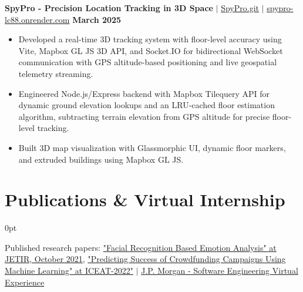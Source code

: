 \documentclass[letterpaper,10pt]{article}
\newlength{\contentindent}
\newcommand{\sectioncontent}[1]{%
  \begin{adjustwidth}{\contentindent}{0pt}%
  #1%
  \end{adjustwidth}%
}
\begin{document}
{\textbf{SpyPro - Precision Location Tracking in 3D Space} $|$ \href{https://github.com/Saurav-Kalaskar/SpyPro.git}{SpyPro.git} $|$ \href{https://spypro-lc88.onrender.com/} {spypro-lc88.onrender.com} \hfill \textbf{March 2025}
\begin{itemize}
    \item Developed a real-time 3D tracking system with floor-level accuracy using Vite, Mapbox GL JS 3D API, and Socket.IO for bidirectional WebSocket communication with GPS altitude-based positioning and live geospatial telemetry streaming.
    \item Engineered Node.js/Express backend with Mapbox Tilequery API for dynamic ground elevation lookups and an LRU-cached floor estimation algorithm, subtracting terrain elevation from GPS altitude for precise floor-level tracking.
    \item Built 3D map visualization with Glassmorphic UI, dynamic floor markers, and extruded buildings using Mapbox GL JS.
\end{itemize}
}


\section{Publications \& Virtual Internship}
\sectioncontent{
{Published research papers: \href{https://www.jetir.org/view?paper=JETIRFD06059}{"Facial Recognition Based Emotion Analysis" at JETIR, October 2021}},  \href{https://drive.google.com/file/d/1oAuZegjDGTgZXc2WC4bzxeZQ2XF0wVNs/view?usp=sharing}{"Predicting Success of Crowdfunding Campaigns Using Machine Learning" at ICEAT-2022"} $|$
\href{https://drive.google.com/file/d/1KVM6ewcn56FYNm9yJX6cdct4bhXv-Cez/view?usp=sharing}{J.P. Morgan - Software Engineering Virtual Experience}
}
\end{document}
